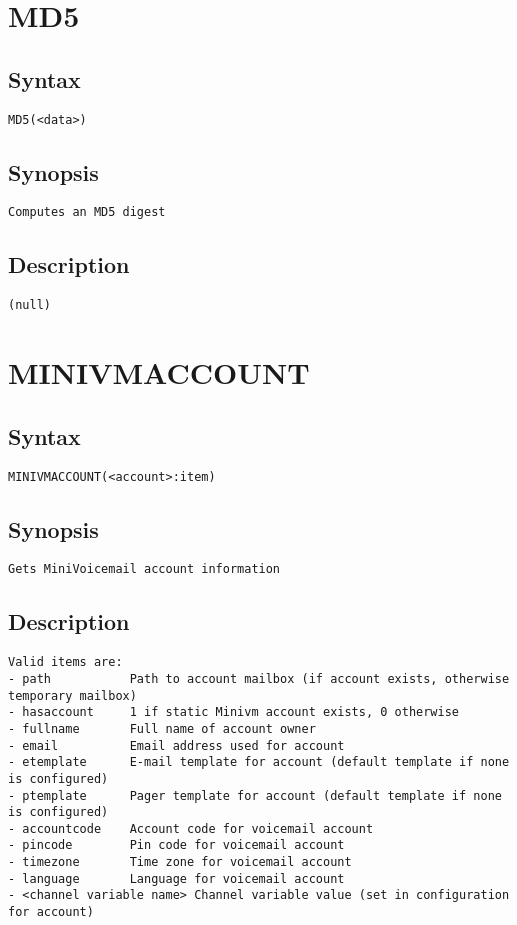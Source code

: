 \section{MD5}
\subsection{Syntax}
\begin{verbatim}
MD5(<data>)
\end{verbatim}
\subsection{Synopsis}
\begin{verbatim}
Computes an MD5 digest
\end{verbatim}
\subsection{Description}
\begin{verbatim}
(null)
\end{verbatim}


\section{MINIVMACCOUNT}
\subsection{Syntax}
\begin{verbatim}
MINIVMACCOUNT(<account>:item)
\end{verbatim}
\subsection{Synopsis}
\begin{verbatim}
Gets MiniVoicemail account information
\end{verbatim}
\subsection{Description}
\begin{verbatim}
Valid items are:
- path           Path to account mailbox (if account exists, otherwise temporary mailbox)
- hasaccount     1 if static Minivm account exists, 0 otherwise
- fullname       Full name of account owner
- email          Email address used for account
- etemplate      E-mail template for account (default template if none is configured)
- ptemplate      Pager template for account (default template if none is configured)
- accountcode    Account code for voicemail account
- pincode        Pin code for voicemail account
- timezone       Time zone for voicemail account
- language       Language for voicemail account
- <channel variable name> Channel variable value (set in configuration for account)


\end{verbatim}


